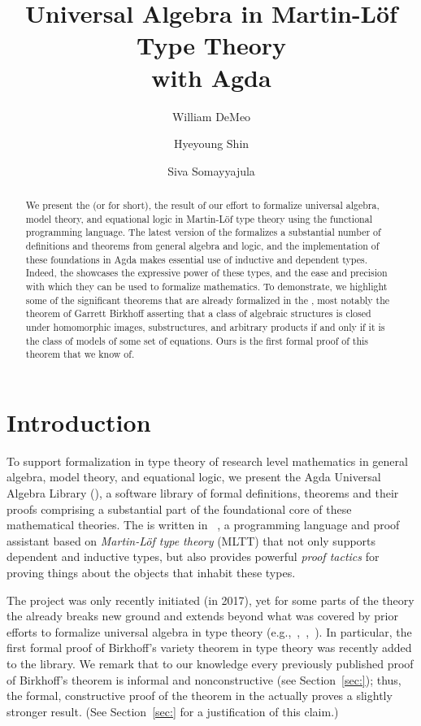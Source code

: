 \documentclass[a4paper,USenglish,cleveref,autoref,thm-restate]{lipics-v2019}
\title{Universal Algebra in Martin-L\"of Type Theory\\ with Agda} %
\author{William DeMeo}{Department of Algebra, Faculty of Mathematics and Physics, Charles University, Czech Republic}{williamdemeo@gmail.com}{https://orcid.org/0000-0003-1832-5690}{}
\author{Hyeyoung Shin}{Faculty of Information Technology, Czech Technical University, Czech Republic}{hyeyoungshinw@gmail.com}{}{}
\author{Siva Somayyajula}{Department of Computer Science, Carnegie Mellon University, USA}{ssomayya@andrew.cmu.edu}{}{}
\begin{document}
\maketitle

\begin{abstract}
We present the \AgdaUALib (or \agdaualib for short), the result of our effort to formalize universal algebra, model theory, and equational logic in Martin-L\"of type theory using the \agda functional programming language.
The latest version of the \agdaualib formalizes a substantial number of definitions and theorems from general algebra and logic, and the implementation of these foundations in Agda makes essential use of inductive and dependent types. Indeed, the \agdaualib showcases the expressive power of these types, and the ease and precision with which they can be used to formalize mathematics.  To demonstrate, we highlight some of the significant theorems that are already formalized in the \agdaualib, most notably the theorem of Garrett Birkhoff asserting that a class of algebraic structures is closed under homomorphic images, substructures, and arbitrary products if and only if it is the class of models of some set of equations. Ours is the first formal proof of this theorem that we know of.
\end{abstract}

\newpage

\section{Introduction}\label{sec:introduction}
To support formalization in type theory of research level mathematics in general algebra, model theory, and equational logic, we present the Agda Universal Algebra Library (\agdaualib), a software library of formal definitions, theorems and their proofs comprising a substantial part of the foundational core of these mathematical theories.
The \agdaualib is written in \agda~\cite{Norell:2009}, a programming language and proof assistant based on \textit{Martin-L\"of type theory} (MLTT) that not only supports dependent and inductive types, but also provides powerful \emph{proof tactics} for proving things about the objects that inhabit these types.

The project was only recently initiated (in 2017), yet for some parts of the theory the \agdaualib already breaks new ground and extends beyond what was covered by prior efforts to formalize universal algebra in type theory (e.g.,~\cite{Capretta:1999},~\cite{Gunther:2018},~\cite{Spitters:2011}). In particular, the first formal proof of Birkhoff's variety theorem in type theory was recently added to the library. We remark that to our knowledge every previously published proof of Birkhoff's theorem is informal and nonconstructive (see Section~\ref{sec:}); thus, the formal, constructive proof of the theorem in the \agdaualib actually proves a slightly stronger result. (See Section~\ref{sec:} for a justification of this claim.)
\end{document}
